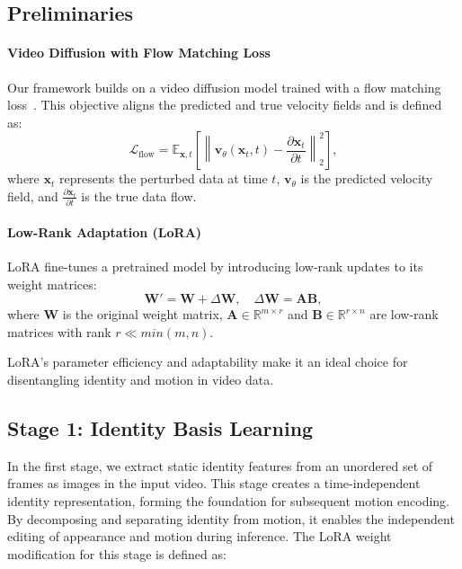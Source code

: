 \subsection{Preliminaries}

\paragraph{Video Diffusion with Flow Matching Loss}
Our framework builds on a video diffusion model trained with a flow matching loss~\cite{FlowStraightAndFast, NormFlowStochInterp}. This objective aligns the predicted and true velocity fields and is defined as:
\begin{equation}
\mathcal{L}_{\text{flow}} = \mathbb{E}_{\mathbf{x}, t} \left[ \left\| \mathbf{v}_\theta (\mathbf{x}_t, t) - \frac{\partial \mathbf{x}_t}{\partial t} \right\|_2^2 \right],
\end{equation}
where $\mathbf{x}_t$ represents the perturbed data at time $t$, $\mathbf{v}_\theta$ is the predicted velocity field, and $\frac{\partial \mathbf{x}_t}{\partial t}$ is the true data flow.

\paragraph{Low-Rank Adaptation (LoRA)}
LoRA fine-tunes a pretrained model by introducing low-rank updates to its weight matrices:
\begin{equation}
\mathbf{W}' = \mathbf{W} + \Delta \mathbf{W}, \quad \Delta \mathbf{W} = \mathbf{A} \mathbf{B},
\end{equation}
where $\mathbf{W}$ is the original weight matrix, $\mathbf{A} \in \mathbb{R}^{m \times r}$ and $\mathbf{B} \in \mathbb{R}^{r \times n}$ are low-rank matrices with rank $r \ll min(m,n)$. 

LoRA’s parameter efficiency and adaptability make it an ideal choice for disentangling identity and motion in video data.

\subsection{Stage 1: Identity Basis Learning}





In the first stage, we extract static identity features from an unordered set of frames as images in the input video. This stage creates a time-independent identity representation, forming the foundation for subsequent motion encoding. By decomposing and separating identity from motion, it enables the independent editing of appearance and motion during inference. The LoRA weight modification for this stage is defined as:

